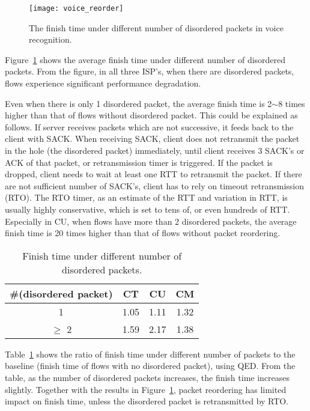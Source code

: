 \begin{figure}[th]
\centering
\texttt{[image: voice\_reorder]}
\caption{The finish time under different number of disordered packets in voice recognition.}
\label{fig:voice_reorder}
\end{figure}

Figure~\ref{fig:voice_reorder} shows the average finish time under different number of disordered packets. From the figure, in all three ISP's, when there are disordered packets, flows experience significant performance degradation.

Even when there is only 1 disordered packet, the average finish time is 2$\sim$8 times higher than that of flows without disordered packet. This could be explained as follows. If server receives packets which are not successive, it feeds back to the client with SACK. When receiving SACK, client does not retransmit the packet in the hole (\ie the disordered packet) immediately, until client receives 3 SACK's or ACK of that packet, or retransmission timer is triggered. If the packet is dropped, client needs to wait at least one RTT to retransmit the packet. If there are not sufficient number of SACK's, client has to rely on timeout retransmission (RTO). The RTO timer, as an estimate of the RTT and variation in RTT, is usually highly conservative, which is set to tens of, or even hundreds of RTT. Especially in CU, when flows have more than 2 disordered packets, the average finish time is 20 times higher than that of flows without packet reordering.

\begin{table}[th]
\caption{Finish time under different number of disordered packets.}
\label{tab:voice_qed_reorder}
\centering
\renewcommand{\arraystretch}{1.2}
\begin{tabular}{c|c|c|c}
	\toprule
	\#(disordered packet) & CT & CU & CM \\
	\midrule
	1 & 1.05 & 1.11 & 1.32 \\
	\hline
	$\ge$ 2 & 1.59 & 2.17 & 1.38 \\
	\bottomrule
\end{tabular}
\end{table}

Table~\ref{tab:voice_qed_reorder} shows the ratio of finish time under different number of packets to the baseline (\ie finish time of flows with no disordered packet), using QED. From the table, as the number of disordered packets increases, the finish time increases slightly. Together with the results in Figure~\ref{fig:voice_reorder}, packet reordering has limited impact on finish time, unless the disordered packet is retransmitted by RTO.

